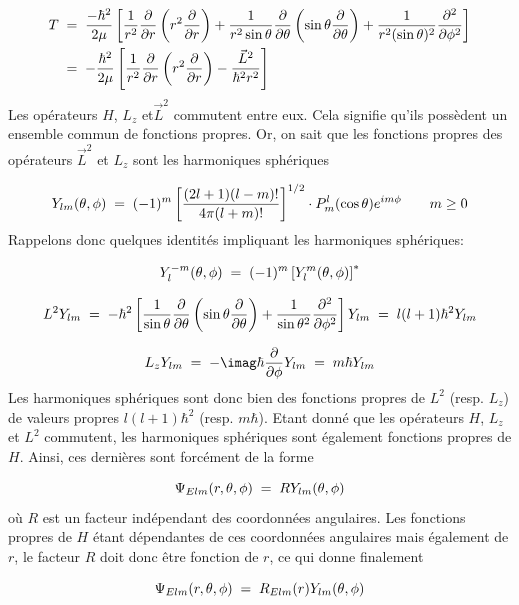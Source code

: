 \begin{align*}
    T&\; = \;
    \dfrac{-\hbar^2}{2\mu}\left[\dfrac{1}{r^2}\dfrac{\partial}{\partial r}\left(r^2\dfrac{\partial}{\partial r}\right)+\dfrac{1}{r^2\sin{\theta}}\dfrac{\partial}{\partial \theta}\left(\sin{\theta}\dfrac{\partial}{\partial \theta}\right)+\dfrac{1}{r^2(\sin{\theta})^2}\dfrac{\partial ^2}{\partial\phi^2}\right]\\
    &\; = \;-\dfrac{\hbar^2}{2\mu}\left[\dfrac{1}{r^2}\dfrac{\partial}{\partial r}\left(r^2\dfrac{\partial}{\partial r}\right)-\dfrac{\Vec{L}^2}{\hbar^2r^2}\right]
\end{align*}
Les opérateurs $H$, $L_z$ et$\Vec{L}^2$ commutent entre eux. Cela signifie qu'ils possèdent un ensemble commun de fonctions propres. Or, on sait que les fonctions propres des opérateurs $\Vec{L}^2$ et $L_z$ sont les harmoniques sphériques

\begin{align*}
    Y_{lm}(\theta, \phi) \; = \; (-1)^m \left[ \dfrac{(2l+1)(l-m)!}{4\pi(l+m)!}\right]^{1/2} \cdot P^{l}_{m}(\cos{\theta})e^{im\phi} \qquad m\ge0
\end{align*}
Rappelons donc quelques identités impliquant les harmoniques sphériques:


\[
    Y_{l}^{-m}(\theta, \phi)\; = \; (-1)^m\left[Y_{l}^{m}(\theta, \phi)\right]^{*}
\]

\[
    L^2Y_{lm}\; = \;-\hbar^2 \left[\dfrac{1}{\sin{\theta}}\dfrac{\partial}{\partial\theta}\left(\sin{\theta}\dfrac{\partial}{\partial\theta}\right)+\dfrac{1}{\sin{\theta}^2}\dfrac{\partial^2}{\partial\phi^2}\right]Y_{lm}\; = \; l(l+1)\hbar^2Y_{lm}
\]

\[
    L_zY_{lm}\eq-\imag\hbar\dfrac{\partial}{\partial\phi}Y_{lm}\eq m\hbar Y_{lm}
\]
Les harmoniques sphériques sont donc bien des fonctions propres de $L^2$ (resp. $L_z$) de valeurs propres $l(l+1)\hbar^2$ (resp. $m\hbar$). Etant donné que les opérateurs $H$, $L_z$ et $L^2$ commutent, les harmoniques sphériques sont également fonctions propres de $H$. Ainsi, ces dernières sont forcément de la forme

\[
    \Psi_{Elm}(r,\theta,\phi)\; = \; R Y_{lm}(\theta,\phi)
\]
où $R$ est un facteur indépendant des coordonnées angulaires. Les fonctions propres de $H$ étant dépendantes de ces coordonnées angulaires mais également de $r$, le facteur $R$ doit donc être fonction de $r$, ce qui donne finalement

\begin{equation}
    \Psi_{Elm}(r,\theta,\phi)\; = \; R_{Elm}(r) Y_{lm}(\theta,\phi)
    \label{decompopsi}
\end{equation}



